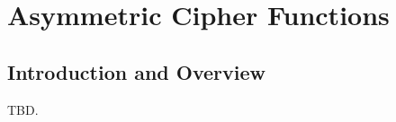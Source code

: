 \chapter{Asymmetric Cipher Functions}
\label{ccip1}

\section{Introduction and Overview}
\label{ccip1:siov0}

TBD.

